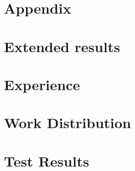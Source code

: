 \section*{Appendix}
\appendix
\section{Extended results} \label{app:results}

\section{Experience}

\section{Work Distribution}

\section{Test Results}